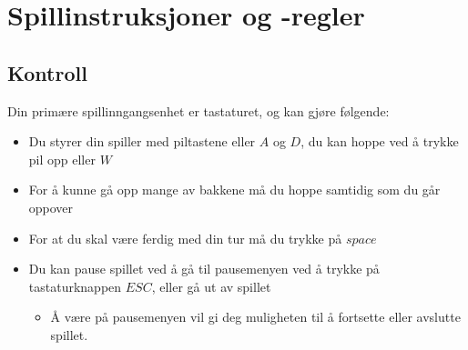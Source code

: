 \documentclass[paper=a4]{article}
\begin{document}
\section{Spillinstruksjoner og -regler}

\subsection{Kontroll}
Din primære spillinngangsenhet er tastaturet, og kan gjøre følgende:
\begin{itemize}
	\item{Du styrer din spiller med piltastene eller $A$ og $D$, du kan hoppe ved å trykke pil opp eller $W$}
	\item{For å kunne gå opp mange av bakkene må du hoppe samtidig som du går oppover}
	\item{For at du skal være ferdig med din tur må du trykke på $space$}
	\item{Du kan pause spillet ved å gå til pausemenyen ved å trykke på tastaturknappen $ESC$, eller gå ut av spillet}
	\begin{itemize}
		\item{Å være på pausemenyen vil gi deg muligheten til å fortsette eller avslutte spillet.}
	\end{itemize}
\end{itemize}
\end{document}
